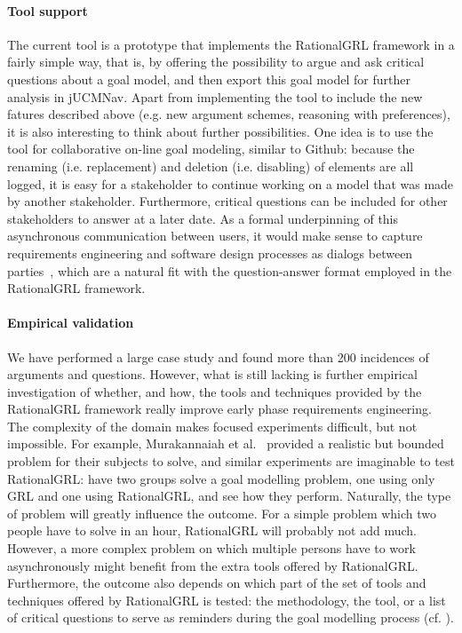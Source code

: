 \paragraph{Tool support}
The current tool is a prototype that implements the RationalGRL framework in a fairly simple way, that is, by offering the possibility to argue and ask critical questions about a goal model, and then export this goal model for further analysis in jUCMNav. Apart from implementing the tool to include the new fatures described above (e.g. new argument schemes, reasoning with preferences), it is also interesting to think about further possibilities. One idea is to use the tool for collaborative on-line goal modeling, similar to Github: because the renaming (i.e. replacement) and deletion (i.e. disabling) of elements are all logged, it is easy for a stakeholder to continue working on a model that was made by another stakeholder. Furthermore, critical questions can be included for other stakeholders to answer at a later date. As a formal underpinning of this asynchronous communication between users, it would make sense to capture requirements engineering and software design processes as dialogs between parties~\cite{finkelstein1989multiparty,BlackEtal2013}, which are a natural fit with the question-answer format employed in the RationalGRL framework. 

\paragraph{Empirical validation}
We have performed a large case study and found more than 200 incidences of arguments and questions. However, what is still lacking is further empirical investigation of whether, and how, the tools and techniques provided by the RationalGRL framework really improve early phase requirements engineering. The complexity of the domain makes focused experiments difficult, but not impossible. For example, Murakannaiah et al.~\cite{murukannaiah2015} provided a realistic but bounded problem for their subjects to solve, and similar experiments are imaginable to test RationalGRL: have two groups solve a goal modelling problem, one using only GRL and one using RationalGRL, and see how they perform. Naturally, the type of problem will greatly influence the outcome. For a simple problem which two people have to solve in an hour, RationalGRL will probably not add much. However, a more complex problem on which multiple persons have to work asynchronously might benefit from the extra tools offered by RationalGRL. Furthermore, the outcome also depends on which part of the set of tools and techniques offered by RationalGRL is tested: the methodology, the tool, or a list of critical questions to serve as reminders during the goal modelling process (cf. \cite{SchriekEtal2016}).








